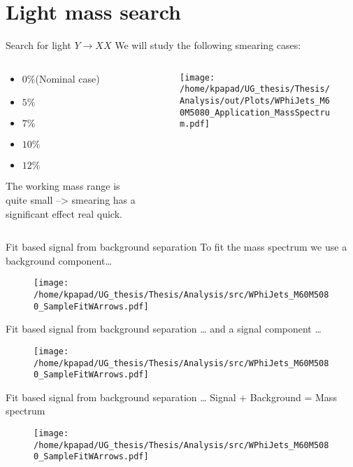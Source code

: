 \documentclass[bigger]{beamer}
\begin{document}
\section{Light mass search}
\label{sec:orgcf1a404}
\begin{frame}[label={sec:org6dc42e6}]{Search for light \(Y \rightarrow XX\)}
We will study the following smearing cases:
\begin{columns}
\begin{column}{0.5\columnwidth}
\begin{itemize}
\item \(0\%\)(Nominal case)
\item \(5\%\)
\item \(7\%\)
\item \(10\%\)
\item \(12\%\)
\end{itemize}
The working mass range is quite small --> smearing has a significant effect real quick.
\end{column}
\begin{column}{0.5\columnwidth}
\begin{figure}[h]
\centering
\texttt{[image: /home/kpapad/UG\_thesis/Thesis/Analysis/out/Plots/WPhiJets\_M60M5080\_Application\_MassSpectrum.pdf]}
\end{figure}
\end{column}
\end{columns}
\end{frame}
\begin{frame}[label={sec:orgf8766d4}]{Fit based signal from background separation}
To fit the mass spectrum we use a background component\ldots{}
\begin{figure}[hb]
\centering
\texttt{[image: /home/kpapad/UG\_thesis/Thesis/Analysis/src/WPhiJets\_M60M5080\_SampleFitWArrows.pdf]}
\end{figure}
\end{frame}
\begin{frame}[label={sec:org7bc0b4a}]{Fit based signal from background separation}
\ldots{} and a signal component \ldots{}
\begin{figure}[hb]
\centering
\texttt{[image: /home/kpapad/UG\_thesis/Thesis/Analysis/src/WPhiJets\_M60M5080\_SampleFitWArrows.pdf]}
\end{figure}
\end{frame}
\begin{frame}[label={sec:org79afe46}]{Fit based signal from background separation}
\ldots{} Signal + Background = Mass spectrum
\begin{figure}[hb]
\centering
\texttt{[image: /home/kpapad/UG\_thesis/Thesis/Analysis/src/WPhiJets\_M60M5080\_SampleFitWArrows.pdf]}
\end{figure}
\end{frame}
\end{document}
